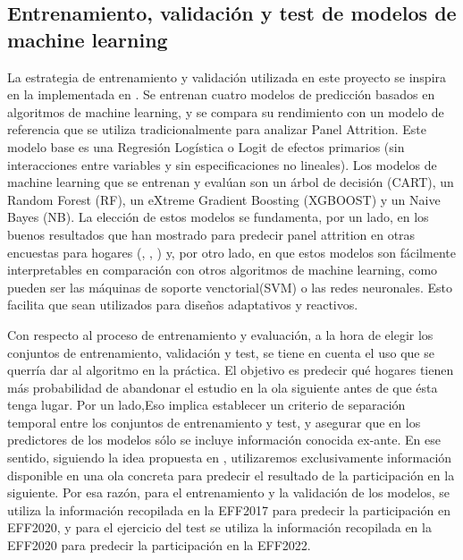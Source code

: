 \subsection*{Entrenamiento, validación y test de modelos de machine learning}

La estrategia de entrenamiento y validación utilizada en este proyecto se inspira en la implementada en \cite{beste2023case}. Se entrenan cuatro modelos de predicción basados en algoritmos de machine learning, y se compara su rendimiento con un modelo de referencia que se utiliza tradicionalmente para analizar Panel Attrition. Este modelo base es una Regresión Logística o Logit de efectos primarios (sin interacciones entre variables y sin especificaciones no lineales). Los modelos de machine learning que se entrenan y evalúan son un árbol de decisión (CART), un Random Forest (RF), un eXtreme Gradient Boosting (XGBOOST) y un Naive Bayes (NB). La elección de estos modelos se fundamenta, por un lado, en los buenos resultados que han mostrado para predecir panel attrition en otras encuestas para hogares (\cite{kern2019tree}, \cite{kern2021predicting}, \cite{beste2023case}) y, por otro lado, en que estos modelos son fácilmente interpretables en comparación con otros algoritmos de machine learning, como pueden ser las máquinas de soporte venctorial(SVM) o las redes neuronales. Esto facilita que sean utilizados para diseños adaptativos y reactivos.

Con respecto al proceso de entrenamiento y evaluación, a la hora de elegir los conjuntos de entrenamiento, validación y test, se tiene en cuenta el uso que se querría dar al algoritmo en la práctica. El objetivo es predecir qué hogares tienen más probabilidad de abandonar el estudio en la ola siguiente antes de que ésta tenga lugar. Por un lado,Eso implica establecer un criterio de separación temporal entre los conjuntos de entrenamiento y test, y asegurar que en los predictores de los modelos sólo se incluye información conocida ex-ante. En ese sentido, siguiendo la idea propuesta en \cite{beste2023case}, utilizaremos exclusivamente información disponible en una ola concreta para predecir el resultado de la participación en la siguiente. Por esa razón, para el entrenamiento y la validación de los modelos, se utiliza la información recopilada en la EFF2017 para predecir la participación en EFF2020, y para el ejercicio del test se utiliza la información recopilada en la EFF2020 para predecir la participación en la EFF2022.


